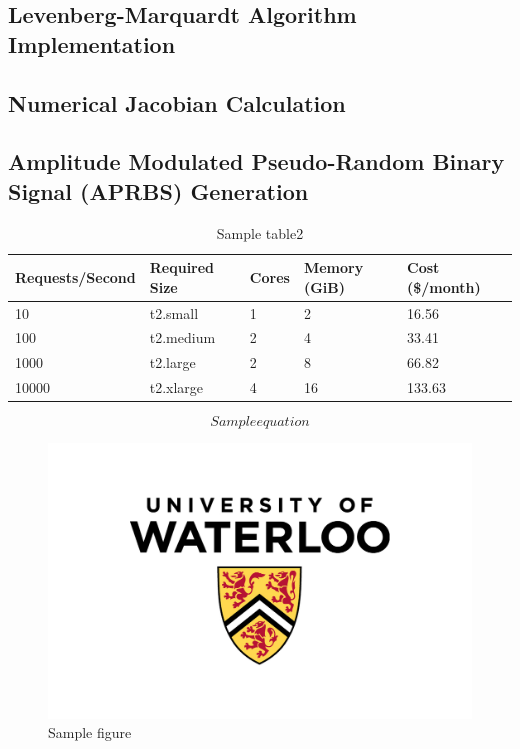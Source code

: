 \documentclass[letterpaper,12pt]{article}
\begin{document}
\subsection{Levenberg-Marquardt Algorithm Implementation}

\subsection{Numerical Jacobian Calculation}

\subsection{Amplitude Modulated Pseudo-Random Binary Signal (APRBS) Generation}



\begin{table}[H]
	\begin{center}
		\caption{Sample table2}
        \label{tab:sampletable}
        \begin{tabular}{l|l|l|l|l}
        Requests/Second & Required Size & Cores & Memory (GiB) & Cost (\$/month)\\
        \hline
        10 & t2.small & 1 & 2 & 16.56\\
        100 & t2.medium & 2 & 4 & 33.41\\
        1000 & t2.large & 2 & 8 & 66.82\\
        10000 & t2.xlarge & 4 & 16 & 133.63\\
        \end{tabular}
	\end{center}
\end{table}

\begin{equation}
\label{eq:equation}
Sample equation
\end{equation}

\begin{figure}[H]
\centering \includegraphics[width=0.8\columnwidth]{UW.jpg}
\caption{\label{fig:figure}Sample figure}
\end{figure}
\pagebreak
\end{document}
